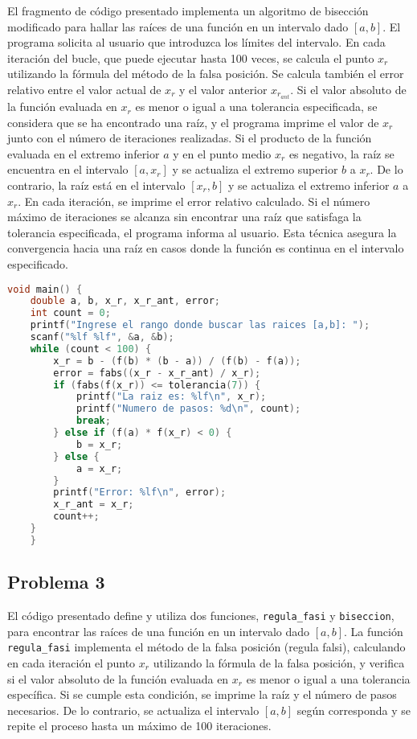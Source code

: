 \documentclass[12pt]{article}
\begin{document}
El fragmento de código presentado implementa un algoritmo de bisección modificado para hallar las raíces de una función en un intervalo dado \([a,b]\). El programa solicita al usuario que introduzca los límites del intervalo. En cada iteración del bucle, que puede ejecutar hasta 100 veces, se calcula el punto \(x_r\) utilizando la fórmula del método de la falsa posición. Se calcula también el error relativo entre el valor actual de \(x_r\) y el valor anterior \(x_r_{ant}\). Si el valor absoluto de la función evaluada en \(x_r\) es menor o igual a una tolerancia especificada, se considera que se ha encontrado una raíz, y el programa imprime el valor de \(x_r\) junto con el número de iteraciones realizadas. Si el producto de la función evaluada en el extremo inferior \(a\) y en el punto medio \(x_r\) es negativo, la raíz se encuentra en el intervalo \([a, x_r]\) y se actualiza el extremo superior \(b\) a \(x_r\). De lo contrario, la raíz está en el intervalo \([x_r, b]\) y se actualiza el extremo inferior \(a\) a \(x_r\). En cada iteración, se imprime el error relativo calculado. Si el número máximo de iteraciones se alcanza sin encontrar una raíz que satisfaga la tolerancia especificada, el programa informa al usuario. Esta técnica asegura la convergencia hacia una raíz en casos donde la función es continua en el intervalo especificado.

\begin{lstlisting}[language=C, caption={Problema 2.}, style=mystyle]
void main() {
    double a, b, x_r, x_r_ant, error;
    int count = 0;
    printf("Ingrese el rango donde buscar las raices [a,b]: ");
    scanf("%lf %lf", &a, &b);
    while (count < 100) {
        x_r = b - (f(b) * (b - a)) / (f(b) - f(a));
        error = fabs((x_r - x_r_ant) / x_r);
        if (fabs(f(x_r)) <= tolerancia(7)) {
            printf("La raiz es: %lf\n", x_r);
            printf("Numero de pasos: %d\n", count);
            break;
        } else if (f(a) * f(x_r) < 0) {
            b = x_r;
        } else {
            a = x_r;
        }
        printf("Error: %lf\n", error);
        x_r_ant = x_r;
        count++;
    }
    }
    \end{lstlisting}
    
\subsection{Problema 3}
 El código presentado define y utiliza dos funciones, \texttt{regula\_fasi} y \texttt{biseccion}, para encontrar las raíces de una función en un intervalo dado \([a,b]\). La función \texttt{regula\_fasi} implementa el método de la falsa posición (regula falsi), calculando en cada iteración el punto \(x_r\) utilizando la fórmula de la falsa posición, y verifica si el valor absoluto de la función evaluada en \(x_r\) es menor o igual a una tolerancia específica. Si se cumple esta condición, se imprime la raíz y el número de pasos necesarios. De lo contrario, se actualiza el intervalo \([a,b]\) según corresponda y se repite el proceso hasta un máximo de 100 iteraciones.
\end{document}
